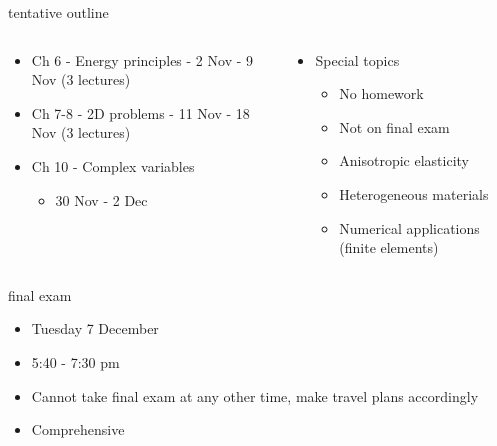 \documentclass[
  letterpaper,
  ignorenonframetext,
  aspectratio=43,
  handout,
  12pt]{beamer}
\providecommand{\tightlist}{%
  \setlength{\itemsep}{0pt}\setlength{\parskip}{0pt}}
\providecommand{\tightlist}{%
\setlength{\itemsep}{0pt}\setlength{\parskip}{0pt}}
\begin{document}
\begin{frame}{tentative outline}
\protect\hypertarget{tentative-outline-2}{}
\begin{columns}[T]
\begin{column}{0.5\textwidth}
\begin{itemize}
\tightlist
\item
  Ch 6 - Energy principles - 2 Nov - 9 Nov (3 lectures)
\item
  Ch 7-8 - 2D problems - 11 Nov - 18 Nov (3 lectures)
\item
  Ch 10 - Complex variables

  \begin{itemize}
  \tightlist
  \item
    30 Nov - 2 Dec
  \end{itemize}
\end{itemize}
\end{column}

\begin{column}{0.5\textwidth}
\begin{itemize}
\tightlist
\item
  Special topics

  \begin{itemize}
  \tightlist
  \item
    No homework
  \item
    Not on final exam
  \item
    Anisotropic elasticity
  \item
    Heterogeneous materials
  \item
    Numerical applications (finite elements)
  \end{itemize}
\end{itemize}
\end{column}
\end{columns}
\end{frame}

\begin{frame}{final exam}
\protect\hypertarget{final-exam}{}
\begin{itemize}
\tightlist
\item
  Tuesday 7 December
\item
  5:40 - 7:30 pm
\item
  Cannot take final exam at any other time, make travel plans
  accordingly
\item
  Comprehensive
\end{itemize}
\end{frame}
\end{document}

